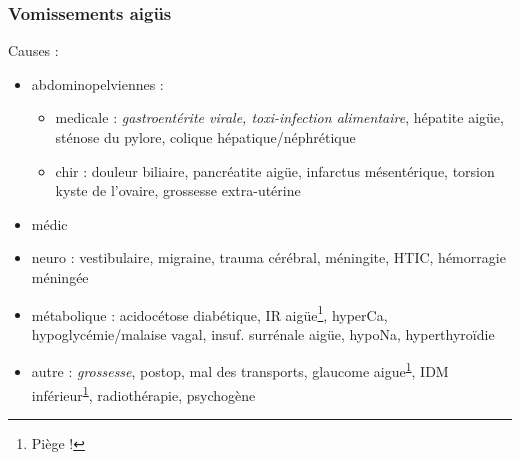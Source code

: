 \documentclass[11pt]{article}
\begin{document}
\subsubsection{Vomissements aigüs}
\label{sec:org453d311}
Causes :
\begin{itemize}
\item abdominopelviennes :
\begin{itemize}
\item medicale : \emph{gastroentérite virale, toxi-infection alimentaire}, hépatite
aigüe, sténose du pylore, colique hépatique/néphrétique
\item chir : douleur biliaire, pancréatite aigüe, infarctus mésentérique, torsion
kyste de l'ovaire, grossesse extra-utérine
\end{itemize}
\item médic
\item neuro : vestibulaire, migraine, trauma cérébral, méningite, HTIC, hémorragie
méningée
\item métabolique : acidocétose diabétique, IR aigüe\footnote{Piège !\label{org450d505}}, hyperCa, hypoglycémie/malaise
vagal, insuf. surrénale aigüe, hypoNa, hyperthyroïdie
\item autre : \emph{grossesse}, postop, mal des transports, glaucome aigue\textsuperscript{\ref{org450d505}}, IDM
inférieur\textsuperscript{\ref{org450d505}}, radiothérapie, psychogène
\end{itemize}
\end{document}
